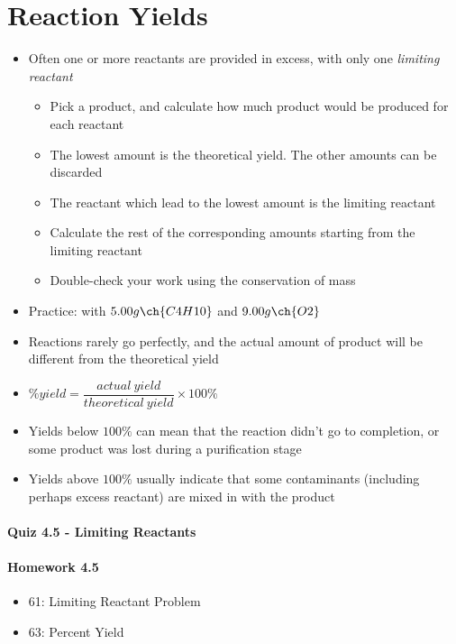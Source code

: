 \documentclass[12pt, openany, letterpaper]{memoir}
\begin{document}
\section{Reaction Yields}
\begin{itemize}
  \item Often one or more reactants are provided in excess, with only one \emph{limiting reactant}
    \begin{itemize}
      \item Pick a product, and calculate how much product would be produced for each reactant
      \item The lowest amount is the theoretical yield. The other amounts can be discarded
      \item The reactant which lead to the lowest amount is the limiting reactant
      \item Calculate the rest of the corresponding amounts starting from the limiting reactant
      \item Double-check your work using the conservation of mass
    \end{itemize}
  \item Practice:  with $5.00g\ch{C4H10}$ and $9.00g\ch{O2}$
  \item Reactions rarely go perfectly, and the actual amount of product will be different from the theoretical yield
  \item $\%yield = \dfrac{actual~yield}{theoretical~yield}\times 100\%$
  \item Yields below $100\%$ can mean that the reaction didn't go to completion, or some product was lost during a purification stage
  \item Yields above $100\%$ usually indicate that some contaminants (including perhaps excess reactant) are mixed in with the product
\end{itemize}

\paragraph*{Quiz 4.5 - Limiting Reactants}
\paragraph*{Homework 4.5}
\begin{itemize}
  \item 61: Limiting Reactant Problem
  \item 63: Percent Yield
\end{itemize}
\end{document}
